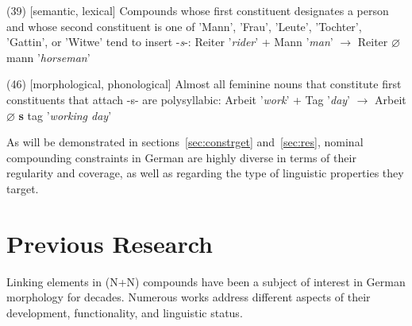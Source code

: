 \documentclass[10pt, a4paper]{article}
\newcommand{\zeroLinker}{\ensuremath{\boldsymbol{\varnothing}}}
\newcommand{\compEx}[7]{%
    #1 '\textit{#2}' + #4 '\textit{#5}'
    $\rightarrow$
    \if\relax\detokenize{#6}\relax
      #1%
    \else
      #6%
    \fi
    \if\relax\detokenize{#3}\relax
      \zeroLinker%
    \else
      \textbf{#3}%
    \fi
    \MakeLowercase{#4} '\textit{#7}'%
}
\begin{document}
\begin{tcolorbox}[breakable, left=0.2em, right=0.2em]
    (39) [semantic, lexical] Compounds whose first constituent designates a person and whose second constituent is one of 'Mann', 'Frau', 'Leute', 'Tochter', 'Gattin', or 'Witwe' tend to insert \mbox{-\textit{s}-}: \compEx{Reiter}{rider}{}{Mann}{man}{}{horseman}

    \vspace{0.25em}

    (46) [morphological, phonological] Almost all feminine nouns that constitute first constituents that attach -s- are polysyllabic: \compEx{Arbeit}{work}{s}{Tag}{day}{}{working day}

    \vspace{-0.15em}
        
\end{tcolorbox}




As will be demonstrated in sections~\ref{sec:constrget} and~\ref{sec:res}, nominal compounding constraints in German are highly diverse in terms of their regularity and coverage, as well as regarding the type of linguistic properties they target.



\section{Previous Research}
\label{sec:back}

Linking elements in (N+N) compounds have been a subject of interest in German morphology for decades. Numerous works address different aspects of their development, functionality, and linguistic status.
\end{document}
